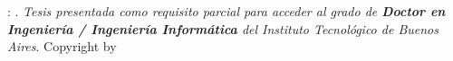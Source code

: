 \vspace*{0.8\textheight}
\noindent \@author: \@title. \textit{Tesis presentada como requisito parcial para acceder al grado de \textbf{Doctor en Ingeniería / Ingeniería Informática} del Instituto Tecnológico de Buenos Aires}. \textcopyright Copyright by \@author

